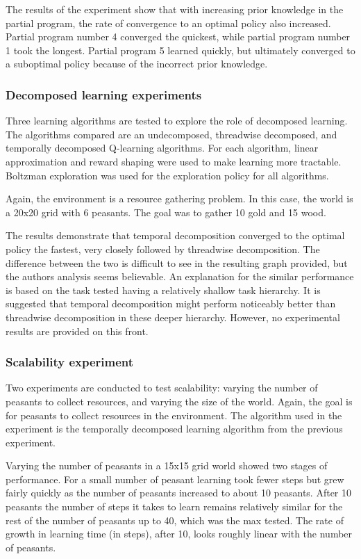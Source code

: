 \documentclass[jair,twoside,11pt,theapa]{article}
\begin{document}
The results of the experiment show that with increasing prior knowledge in the partial program, the rate of convergence to an optimal policy also increased. Partial program number 4 converged the quickest, while partial program number 1 took the longest. Partial program 5 learned quickly, but ultimately converged to a suboptimal policy because of the incorrect prior knowledge.

\subsubsection{Decomposed learning experiments}
Three learning algorithms are tested to explore the role of decomposed learning. The algorithms compared are an undecomposed, threadwise decomposed, and temporally decomposed Q-learning algorithms. For each algorithm, linear approximation and reward shaping were used to make learning more tractable. Boltzman exploration was used for the exploration policy for all algorithms. 

Again, the environment is a resource gathering problem. In this case, the world is a 20x20 grid with 6 peasants. The goal was to gather 10 gold and 15 wood.

The results demonstrate that temporal decomposition converged to the optimal policy the fastest, very closely followed by threadwise decomposition. The difference between the two is difficult to see in the resulting graph provided, but the authors analysis seems believable. An explanation for the similar performance is based on the task tested having a relatively shallow task hierarchy. It is suggested that temporal decomposition might perform noticeably better than threadwise decomposition in these deeper hierarchy. However, no experimental results are provided on this front. 

\subsubsection{Scalability experiment}
Two experiments are conducted to test scalability: varying the number of peasants to collect resources, and varying the size of the world. Again, the goal is for peasants to collect resources in the environment. The algorithm used in the experiment is the temporally decomposed learning algorithm from the previous experiment.

Varying the number of peasants in a 15x15 grid world showed two stages of performance. For a small number of peasant learning took fewer steps but grew fairly quickly as the number of peasants increased to about 10 peasants. After 10 peasants the number of steps it takes to learn remains relatively similar for the rest of the number of peasants up to 40, which was the max tested. The rate of growth in learning time (in steps), after 10, looks roughly linear with the number of peasants. 
\end{document}
